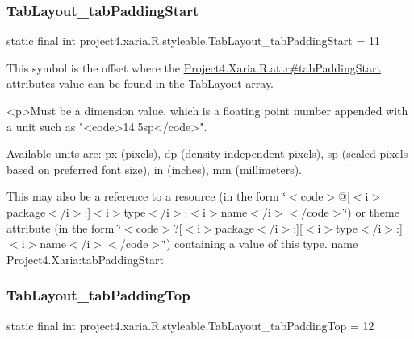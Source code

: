 \subsubsection{\texorpdfstring{Tab\+Layout\+\_\+tab\+Padding\+Start}{TabLayout\_tabPaddingStart}}
{\footnotesize\ttfamily static final int project4.\+xaria.\+R.\+styleable.\+Tab\+Layout\+\_\+tab\+Padding\+Start = 11\hspace{0.3cm}{\ttfamily [static]}}

This symbol is the offset where the \hyperlink{}{Project4.\+Xaria.\+R.\+attr\#tab\+Padding\+Start} attribute\textquotesingle{}s value can be found in the \hyperlink{classproject4_1_1xaria_1_1R_1_1styleable_ab6bfb1f97ae9fba16f4f90d50871d4a8}{Tab\+Layout} array.

\begin{DoxyVerb}      <p>Must be a dimension value, which is a floating point number appended with a unit such as "<code>14.5sp</code>".
\end{DoxyVerb}
 Available units are\+: px (pixels), dp (density-\/independent pixels), sp (scaled pixels based on preferred font size), in (inches), mm (millimeters). 

This may also be a reference to a resource (in the form \char`\"{}$<$code$>$@\mbox{[}$<$i$>$package$<$/i$>$\+:\mbox{]}$<$i$>$type$<$/i$>$\+:$<$i$>$name$<$/i$>$$<$/code$>$\char`\"{}) or theme attribute (in the form \char`\"{}$<$code$>$?\mbox{[}$<$i$>$package$<$/i$>$\+:\mbox{]}\mbox{[}$<$i$>$type$<$/i$>$\+:\mbox{]}$<$i$>$name$<$/i$>$$<$/code$>$\char`\"{}) containing a value of this type.  name Project4.\+Xaria\+:tab\+Padding\+Start \mbox{\label{classproject4_1_1xaria_1_1R_1_1styleable_a5041e5aa45eb71245d2c71dd376b1471}} 
\subsubsection{\texorpdfstring{Tab\+Layout\+\_\+tab\+Padding\+Top}{TabLayout\_tabPaddingTop}}
{\footnotesize\ttfamily static final int project4.\+xaria.\+R.\+styleable.\+Tab\+Layout\+\_\+tab\+Padding\+Top = 12\hspace{0.3cm}{\ttfamily [static]}}

